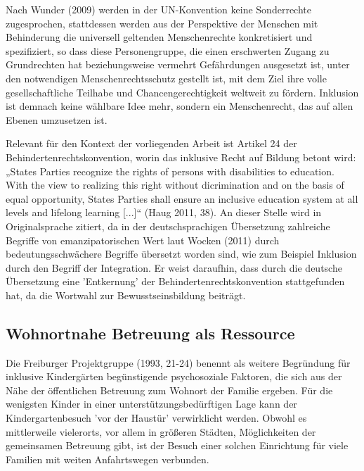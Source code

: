 Nach Wunder (2009) werden in der UN-Konvention keine Sonderrechte zugesprochen, stattdessen werden aus der Perspektive der Menschen mit Behinderung die universell geltenden Menschenrechte konkretisiert und spezifiziert, so dass diese Personengruppe, die einen erschwerten Zugang zu Grundrechten hat beziehungsweise vermehrt Gefährdungen ausgesetzt ist, unter den notwendigen Menschenrechtsschutz gestellt ist, mit dem Ziel ihre volle gesellschaftliche Teilhabe und Chancengerechtigkeit weltweit zu fördern. Inklusion ist demnach keine wählbare Idee mehr, sondern ein Menschenrecht, das auf allen Ebenen umzusetzen ist. 

Relevant für den Kontext der vorliegenden Arbeit ist Artikel 24 der Behindertenrechtskonvention, worin das inklusive Recht auf Bildung betont wird: „States Parties recognize the rights of persons with disabilities to education. With the view to realizing this right without dicrimination and on the basis of equal opportunity, States Parties shall ensure an inclusive education system at all levels and lifelong learning [...]“ (Haug 2011, 38). An dieser Stelle wird in Originalsprache zitiert, da in der deutschsprachigen Übersetzung zahlreiche Begriffe von emanzipatorischen Wert laut Wocken (2011) durch bedeutungsschwächere Begriffe übersetzt worden sind, wie zum Beispiel Inklusion durch den Begriff der Integration. Er weist daraufhin, dass durch die deutsche Übersetzung eine 'Entkernung' der Behindertenrechtskonvention stattgefunden hat, da die Wortwahl zur Bewusstseinsbildung beiträgt.

\subsection{Wohnortnahe Betreuung als Ressource}
Die Freiburger Projektgruppe (1993, 21-24) benennt als weitere Begründung für inklusive Kindergärten begünstigende psychosoziale Faktoren, die sich aus der Nähe der öffentlichen Betreuung zum Wohnort der Familie ergeben. Für die wenigsten Kinder in einer unterstützungsbedürftigen Lage kann der Kindergartenbesuch 'vor der Haustür' verwirklicht werden. Obwohl es mittlerweile vielerorts, vor allem in größeren Städten, Möglichkeiten der gemeinsamen Betreuung gibt, ist der Besuch einer solchen Einrichtung für viele Familien mit weiten Anfahrtswegen verbunden. 

